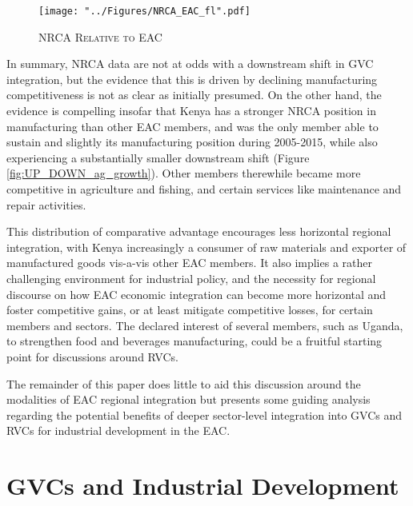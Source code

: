 \documentclass[a4paper]{article}
\begin{document}
\begin{figure}[h!]
\centering
\caption{\label{fig:NRCA_EAC}\textsc{NRCA Relative to EAC}}
\texttt{[image: "../Figures/NRCA\_EAC\_fl".pdf]} %
\vspace{-1cm}
\end{figure}
\FloatBarrier

In summary, NRCA data are not at odds with a downstream shift in GVC integration, but the evidence that this is driven by declining manufacturing competitiveness is not as clear as initially presumed. On the other hand, the evidence is compelling insofar that Kenya has a stronger NRCA position in manufacturing than other EAC members, and was the only member able to sustain and slightly its manufacturing position during 2005-2015, while also experiencing a substantially smaller downstream shift (Figure \ref{fig:UP_DOWN_ag_growth}). Other members therewhile became more competitive in agriculture and fishing, and certain services like maintenance and repair activities. \newline

This distribution of comparative advantage encourages less horizontal regional integration, with Kenya increasingly a consumer of raw materials and exporter of manufactured goods vis-a-vis other EAC members. It also implies a rather challenging environment for industrial policy, and the necessity for regional discourse on how EAC economic integration can become more horizontal and foster competitive gains, or at least mitigate competitive losses, for certain members and sectors.  %
The declared interest of several members, such as Uganda, to strengthen food and beverages manufacturing, could be a fruitful starting point for discussions around RVCs. \newline

 The remainder of this paper does little to aid this discussion around the modalities of EAC regional integration but presents some guiding analysis regarding the potential benefits of deeper sector-level integration into GVCs and RVCs for industrial development in the EAC. \newline



\section{GVCs and Industrial Development}
\end{document}
